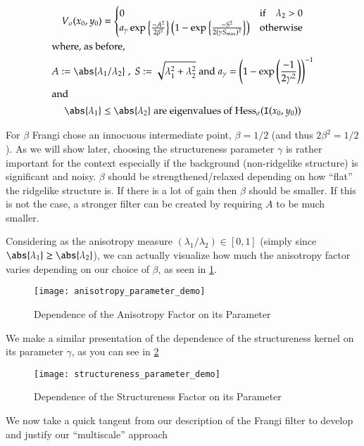 \begin{gather} \label{eq:frangi-vesselness-measure-v1}
V_\sigma(x_0,y_0) = \begin{cases}
0 & \text{if} \quad \lambda_2 > 0 \\
a_\gamma \exp\left\{\frac{-A^2}{2\beta^2}\right\}
\left(1 - \exp\left\{\frac{-S^2}{2(\gamma S_{\max})^2}\right\}\right) & \text{otherwise}
\end{cases} \\
\shortintertext{where, as before,}
A := \abs{\lambda_1 / \lambda_2}
\;,\;
S := \sqrt{\lambda_1^2 + \lambda_2^2}
\;\textrm{and}\;
a_\gamma = \left(1-\exp\left(\frac{-1}{2\gamma^2}\right)\right)^{-1} \notag\\
\shortintertext{and}
\abs{\lambda_1} \le \abs{\lambda_2}
\; \textrm{are eigenvalues of}\; \Hess_\sigma(\img(x_0, y_0)) \notag
\end{gather}

For $\beta$ Frangi chose an innocuous intermediate point, $\beta=1/2$ (and thus $2\beta^2 = 1/2$).
As we will show later, choosing the structureness parameter $\gamma$ is rather important for the context especially if the background (non-ridgelike structure) is significant and noisy. $\beta$ should be strengthened/relaxed depending on how ``flat'' the ridgelike structure is. If there is a lot of gain then $\beta$ should be smaller. If this is not the case, a stronger filter can be created by requiring $A$ to be much smaller.

Considering as the anisotropy measure $(\lambda_1 / \lambda_2) \in [0,1]$ (simply since $\abs{\lambda_1} \ge \abs{\lambda_2}$), we can actually visualize how much the 
anisotropy factor varies depending on our choice of $\beta$, as seen in \cref{fig:anisotropy-parameter-demo}.

\begin{figure}
  \texttt{[image: anisotropy\_parameter\_demo]}
  \caption{Dependence of the Anisotropy Factor on its Parameter}
  \label{fig:anisotropy-parameter-demo}
\end{figure}

We make a similar presentation of the dependence of the structureness kernel on its parameter $\gamma$, as you can see in
\cref{fig:structureness-parameter-demo}
\begin{figure}
  \texttt{[image: structureness\_parameter\_demo]}
  \caption{Dependence of the Structureness Factor on its Parameter}
  \label{fig:structureness-parameter-demo}
\end{figure}

	We now take a quick tangent from our description of the Frangi filter to develop and justify our ``multiscale'' approach